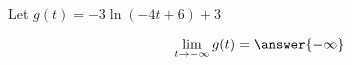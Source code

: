 \documentclass{ximera}
\author{Lee Wayand}
\begin{document}
\begin{exercise}


\begin{question}



Let $g(t) = -3 \ln(-4t + 6) + 3$



\[
\lim\limits_{t \to -\infty} g(t) = \answer{-\infty} 
\]





\end{question}










\end{exercise}
\end{document}

